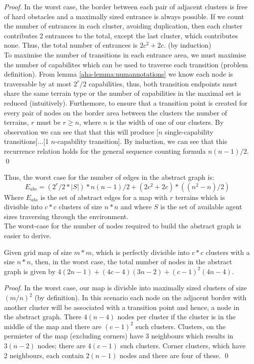 \begin{proof}
In the worst case, the border between each pair of adjacent clusters is free of hard obstacles and a maximally sized entrance is always possible. If we count the number of entrances in each cluster, avoiding duplication, then each cluster contributes 2 entrances to the total, except the last cluster, which contributes none. Thus, the total number of entrances is $2c^2 + 2c$. (by induction) \\
To maximise the number of transitions in each entrance area, we must maximise the number of capabilites which can be used to traverse each transition (problem definition). From lemma \ref{aha-lemma:numannotations} we know each node is traversable by at most $2^r/2$ capabilities, thus, both transition endpoints must share the same terrain type or the number of capabilities in the maximal set is reduced (intuitively).
Furthemore, to ensure that a transition point is created for every pair of nodes on the border area between the clusters the number of terrains, $r$ must be $r \geq n$, where $n$ is the width of one of our clusters. By observation we can see that that this will produce [$n$ single-capability transitions]...[1 $n$-capability transition]. By induction, we can see that this recurrence relation holds for the general sequence counting formula $n(n-1)/2$. \qed
\end{proof}
Thus, the worst case for the number of edges in the abstract graph is: 
\begin{equation}
\label{aha-eq:maxabstractedges}
E_{abs} = (2^r/2 * |S|) * n(n-1)/2 + (2c^2 + 2c)*((n^2-n)/2)
\end{equation}
Where $E_{abs}$ is the set of abstract edges for a map with $r$ terrains which is divisible into $c*c$ clusters of size $n*n$ and where $S$ is the set of available agent sizes traversing through the environment. \\ \newline
The worst-case for the number of nodes required to build the abstract graph is easier to derive. 
\begin{lemma}
\label{aha-lemma:maxnodes}
Given grid map of size $m*m$, which is perfectly divisible into $c*c$ clusters with a size $n*n$, then, in the worst case, the total number of nodes in the abstract graph is given by $4(2n-1) + (4c - 4)(3n-2) + (c-1)^2(4n-4)$.
\end{lemma}

\begin{proof}
In the worst case, our map is divisble into maximally sized clusters of size $(m/n)^2$ (by definition). In this scenario each node on the adjacent border with another cluster will be associated with a transition point and hence, a node in the abstract graph.
There $4(n-4)$ nodes per cluster if the cluster is in the middle of the map and there are $(c-1)^2$ such clusters. Clusters, on the permieter of the map (excluding corners) have 3 neighbours which results in $3(n-2)$ nodes; there are $4(c-1)$ such clusters. Corner clusters, which have 2 neighbours, each contain $2(n-1)$ nodes and there are four of these. \qed
\end{proof}

